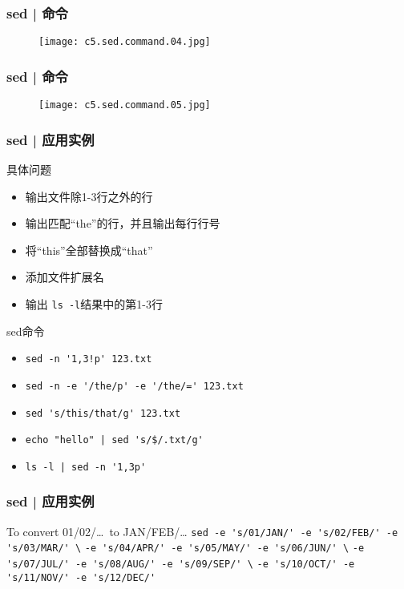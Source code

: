 \begin{frame}
  \frametitle{sed | 命令}
  \begin{figure}
    \centering
    \texttt{[image: c5.sed.command.04.jpg]}
  \end{figure}
\end{frame}

\begin{frame}
  \frametitle{sed | 命令}
  \begin{figure}
    \centering
    \texttt{[image: c5.sed.command.05.jpg]}
  \end{figure}
\end{frame}

\begin{frame}[fragile]
  \frametitle{sed | \alert{应用实例}}
  \begin{block}{具体问题}
    \begin{itemize}
      \item<2-> 输出文件除1-3行之外的行 
      \item<4-> 输出匹配“the”的行，并且输出每行行号
      \item<6-> 将“this”全部替换成“that”
      \item<8-> 添加文件扩展名
      \item<10-> 输出 \verb|ls -l|结果中的第1-3行
    \end{itemize}
  \end{block}
  \begin{block}{sed命令}
    \begin{itemize}
      \item<3-> \verb|sed -n '1,3!p' 123.txt|
      \item<5-> \verb|sed -n -e '/the/p' -e '/the/=' 123.txt|
      \item<7-> \verb|sed 's/this/that/g' 123.txt|
      \item<9-> \verb=echo "hello" | sed 's/$/.txt/g'=
      \item<11-> \verb=ls -l | sed -n '1,3p'=
    \end{itemize}
  \end{block}
\end{frame}

\begin{frame}[fragile]
  \frametitle{sed | 应用实例}
  \begin{block}{To convert 01/02/\ldots \ to JAN/FEB/\ldots}
    \verb|sed -e 's/01/JAN/' -e 's/02/FEB/' -e 's/03/MAR/' \|
    \verb|-e 's/04/APR/' -e 's/05/MAY/' -e 's/06/JUN/' \|
    \verb|-e 's/07/JUL/' -e 's/08/AUG/' -e 's/09/SEP/' \|
    \verb|-e 's/10/OCT/' -e 's/11/NOV/' -e 's/12/DEC/'|
  \end{block}
\end{frame}

